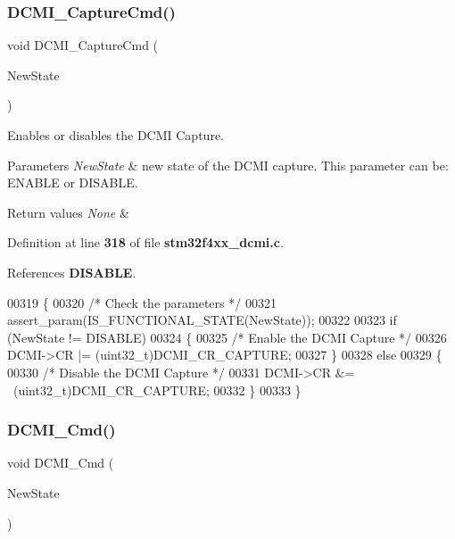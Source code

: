 \subsubsection{D\+C\+M\+I\+\_\+\+Capture\+Cmd()}
{\footnotesize\ttfamily void D\+C\+M\+I\+\_\+\+Capture\+Cmd (\begin{DoxyParamCaption}\item[{\textbf{ Functional\+State}}]{New\+State }\end{DoxyParamCaption})}



Enables or disables the D\+C\+MI Capture. 


\begin{DoxyParams}{Parameters}
{\em New\+State} & new state of the D\+C\+MI capture. This parameter can be\+: E\+N\+A\+B\+LE or D\+I\+S\+A\+B\+LE. \\
\hline
\end{DoxyParams}

\begin{DoxyRetVals}{Return values}
{\em None} & \\
\hline
\end{DoxyRetVals}


Definition at line \textbf{ 318} of file \textbf{ stm32f4xx\+\_\+dcmi.\+c}.



References \textbf{ D\+I\+S\+A\+B\+LE}.


\begin{DoxyCode}
00319 \{
00320   \textcolor{comment}{/* Check the parameters */}
00321   assert_param(IS_FUNCTIONAL_STATE(NewState));
00322     
00323   \textcolor{keywordflow}{if} (NewState != DISABLE)
00324   \{
00325     \textcolor{comment}{/* Enable the DCMI Capture */}
00326     DCMI->CR |= (uint32\_t)DCMI_CR_CAPTURE;
00327   \}
00328   \textcolor{keywordflow}{else}
00329   \{
00330     \textcolor{comment}{/* Disable the DCMI Capture */}
00331     DCMI->CR &= ~(uint32\_t)DCMI_CR_CAPTURE;
00332   \}
00333 \}
\end{DoxyCode}
\mbox{\label{group__DCMI__Group2_ga36bba54c40637b8071aea8ffea71fb84}} 
\subsubsection{D\+C\+M\+I\+\_\+\+Cmd()}
{\footnotesize\ttfamily void D\+C\+M\+I\+\_\+\+Cmd (\begin{DoxyParamCaption}\item[{\textbf{ Functional\+State}}]{New\+State }\end{DoxyParamCaption})}



